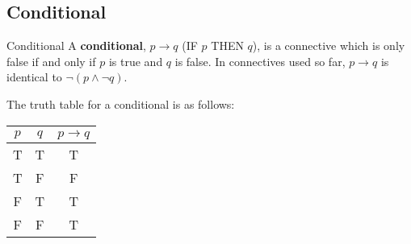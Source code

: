 \subsection{Conditional}


\begin{defn}{Conditional}
  A \textbf{conditional}, $ p \rightarrow q$ (IF $p$ THEN $q$), is a connective which is only false if and only if $p$ is true and $q$ is false.
  In connectives used so far, $p \rightarrow q$ is identical to $\neg (p \land \neg q)$.

  \begin{comment}
  \begin{itemize}
    \item[Modus Ponens] If $p$ is True, then the truth hinges on $q$.
    \item[Transitive] If $p \rightarrow q$ and $q \rightarrow r$, then $p \rightarrow r$ must also be true.
    \item[Contraposition] If $p \rightarrow q$ is True, then so must $\neg q \rightarrow p$.
    \item[Reductio]
  \end{itemize}
  \end{comment}

\end{defn}

The truth table for a conditional is as follows:

\begin{minipage}{\linewidth}
  \centering
  \begin{tabular}{ccc}
    $p$ & $q$ & $p \rightarrow q$ \\
    \hline
    T & T & T \\
    T & F & F \\
    F & T & T \\
    F & F & T \\
  \end{tabular}
   \label{tab:conditonal} 
\end{minipage}

